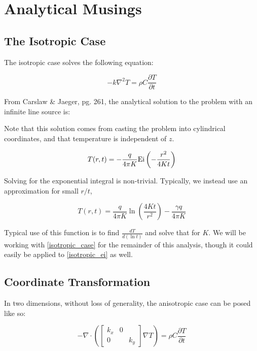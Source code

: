 \chapter{Analytical Musings}
\section{The Isotropic Case}

The isotropic case solves the following equation:

\begin{equation*}
-k\nabla^2 T = \rho C\frac{\partial T}{\partial t}
\end{equation*}

From Carslaw \& Jaeger, pg. 261, the analytical solution to the problem with an infinite line source is:

Note that this solution comes from casting the problem into cylindrical coordinates, and that temperature is independent of \(z\).

\begin{equation}
\label{isotropic_ei}
T(r,t) = - \frac{q}{4\pi K}\textrm{Ei}\left(-\frac{r^2}{4Kt}\right)
\end{equation}

Solving for the exponential integral is non-trivial.  Typically, we instead use an approximation for small \(r/t\),

\begin{equation}
\label{isotropic_case}
T(r,t) = \frac{q}{4\pi K}\ln\left(\frac{4Kt}{r^2}\right) - \frac{\gamma q}{4\pi K}
\end{equation}

Typical use of this function is to find \(\frac{dT}{d(\ln t)}\) and solve that for \(K\). We will be working with \ref{isotropic_case} for the remainder of this analysis, though it could easily be applied to \ref{isotropic_ei} as well.

\section{Coordinate Transformation}

In two dimensions, without loss of generality, the anisotropic case can be posed like so:

\begin{equation}
-\nabla \cdot \left(\begin{bmatrix}k_x & 0\\ 0 && k_y\end{bmatrix}\nabla T \right)= \rho C\frac{\partial T}{\partial t}
\end{equation}

